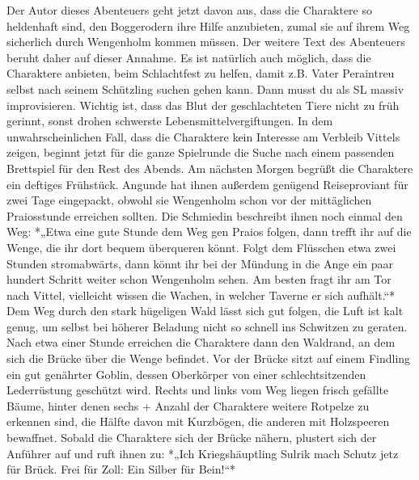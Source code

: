 Der Autor dieses Abenteuers geht jetzt davon aus, dass die Charaktere so heldenhaft sind, den Boggerodern ihre Hilfe anzubieten, zumal sie auf ihrem Weg sicherlich durch Wengenholm kommen müssen. Der weitere Text des Abenteuers beruht daher auf dieser Annahme. Es ist natürlich auch möglich, dass die Charaktere anbieten, beim Schlachtfest zu helfen, damit z.B. Vater Peraintreu selbst nach seinem Schützling suchen gehen kann. Dann musst du als SL massiv improvisieren. Wichtig ist, dass das Blut der geschlachteten Tiere nicht zu früh gerinnt, sonst drohen schwerste Lebensmittelvergiftungen.
In dem unwahrscheinlichen Fall, dass die Charaktere kein Interesse am Verbleib Vittels zeigen, beginnt jetzt für die ganze Spielrunde die Suche nach einem passenden Brettspiel für den Rest des Abends. 
\platz
{}
\platz
Am nächsten Morgen begrüßt die Charaktere ein deftiges Frühstück. Angunde hat ihnen außerdem genügend Reiseproviant für zwei Tage eingepackt, obwohl sie Wengenholm schon vor der mittäglichen Praiosstunde erreichen sollten. Die Schmiedin beschreibt ihnen noch einmal den Weg: *„Etwa eine gute Stunde dem Weg gen Praios folgen, dann trefft ihr auf die Wenge, die ihr dort bequem überqueren könnt. Folgt dem Flüsschen etwa zwei Stunden stromabwärts, dann könnt ihr bei der Mündung in die Ange ein paar hundert Schritt weiter schon Wengenholm sehen. Am besten fragt ihr am Tor nach Vittel, vielleicht wissen die Wachen, in welcher Taverne er sich aufhält.“*
\platz
Dem Weg durch den stark hügeligen Wald lässt sich gut folgen, die Luft ist kalt genug, um selbst bei höherer Beladung nicht so schnell ins Schwitzen zu geraten. Nach etwa einer Stunde erreichen die Charaktere dann den Waldrand, an dem sich die Brücke über die Wenge befindet. Vor der Brücke sitzt auf einem Findling ein gut genährter Goblin, dessen Oberkörper von einer schlechtsitzenden Lederrüstung geschützt wird. Rechts und links vom Weg liegen frisch gefällte Bäume, hinter denen sechs + Anzahl der Charaktere weitere Rotpelze zu erkennen sind, die Hälfte davon mit Kurzbögen, die anderen mit Holzspeeren bewaffnet. Sobald die Charaktere sich der Brücke nähern, plustert sich der Anführer auf und ruft ihnen zu: *„Ich Kriegshäuptling Sulrik mach Schutz jetz für Brück. Frei für Zoll: Ein Silber für Bein!“*

